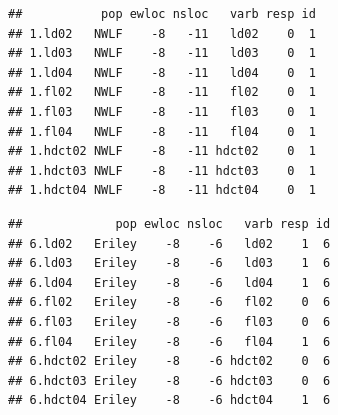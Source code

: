 \documentclass[
  ignorenonframetext,
]{beamer}
\newenvironment{Shaded}{\begin{snugshade}}{\end{snugshade}}
\newcommand{\DecValTok}[1]{\textcolor[rgb]{0.00,0.00,0.81}{#1}}
\newcommand{\FunctionTok}[1]{\textcolor[rgb]{0.00,0.00,0.00}{#1}}
\newcommand{\NormalTok}[1]{#1}
\newcommand{\SpecialCharTok}[1]{\textcolor[rgb]{0.00,0.00,0.00}{#1}}
\begin{document}
\begin{frame}[fragile]{}
\protect\hypertarget{section-2}{}
\tiny

\begin{Shaded}
\end{Shaded}

\begin{verbatim}
##           pop ewloc nsloc   varb resp id
## 1.ld02   NWLF    -8   -11   ld02    0  1
## 1.ld03   NWLF    -8   -11   ld03    0  1
## 1.ld04   NWLF    -8   -11   ld04    0  1
## 1.fl02   NWLF    -8   -11   fl02    0  1
## 1.fl03   NWLF    -8   -11   fl03    0  1
## 1.fl04   NWLF    -8   -11   fl04    0  1
## 1.hdct02 NWLF    -8   -11 hdct02    0  1
## 1.hdct03 NWLF    -8   -11 hdct03    0  1
## 1.hdct04 NWLF    -8   -11 hdct04    0  1
\end{verbatim}

\begin{Shaded}
\end{Shaded}

\begin{verbatim}
##             pop ewloc nsloc   varb resp id
## 6.ld02   Eriley    -8    -6   ld02    1  6
## 6.ld03   Eriley    -8    -6   ld03    1  6
## 6.ld04   Eriley    -8    -6   ld04    1  6
## 6.fl02   Eriley    -8    -6   fl02    0  6
## 6.fl03   Eriley    -8    -6   fl03    0  6
## 6.fl04   Eriley    -8    -6   fl04    1  6
## 6.hdct02 Eriley    -8    -6 hdct02    0  6
## 6.hdct03 Eriley    -8    -6 hdct03    0  6
## 6.hdct04 Eriley    -8    -6 hdct04    1  6
\end{verbatim}
\end{frame}
\end{document}
